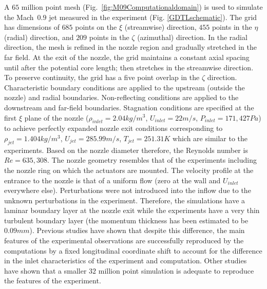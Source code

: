 \documentclass[english]{aiaa-tc}
\begin{document}
 A $65$ million point mesh (Fig.~\ref{fig:M09Computationaldomain}) is
 used to simulate the Mach~$0.9$ jet measured in the experiment (Fig.
 \ref{GDTLschematic}).  The grid has dimensions of $685$ points on the
 $\xi$ (streamwise) direction, $455$ points in the $\eta$ (radial)
 direction, and $209$ points in the $\zeta$ (azimuthal) direction. In
 the radial direction, the mesh is refined in the nozzle region and
 gradually stretched in the far field. At the exit of the nozzle, the
 grid maintains a constant axial spacing until after the potential
 core length; then stretches in the streamwise direction. To
 preserve continuity, the grid has a five point overlap in the $\zeta$
 direction. Characteristic boundary conditions\cite{bj2000-1} are
 applied to the upstream (outside the nozzle) and radial boundaries.
 Non-reflecting conditions are applied to the downstream and far-field
 boundaries. Stagnation conditions are specified at the first $\xi$
 plane of the nozzle ($\rho_{inlet}=2.04kg/m^{3}$, $U_{inlet}=22m/s$, $P_{inlet}=171,427Pa$) to
 achieve perfectly expanded nozzle exit conditions corresponding to
 $\rho_{jet}=1.404kg/m^{3}$, $U_{jet}=285.99m/s$, $T_{jet}=251.31K$ which are similar to the experiments.
 Based on the nozzle diameter therefore, the Reynolds number is
 $Re=635,308$. The nozzle geometry resembles that of the
 experiments including the nozzle ring on which the actuators are
 mounted.
 The velocity profile at the entrance to the nozzle is that
 of a uniform flow (zero at the wall and $U_{inlet}$ everywhere else).
 Perturbations were not introduced into the inflow due to the
 unknown perturbations in the experiment. Therefore, the simulations
 have a laminar boundary layer at the nozzle exit while the
 experiments have a very thin turbulent boundary layer (the momentum
 thickness has been estimated to be $0.09 mm$).  Previous studies have
 shown that despite this difference, the main features of the
 experimental observations are successfully reproduced by the
 computations by a fixed longitudinal coordinate shift to account
 for the difference in the inlet characteristics of the experiment and computation\cite{gdv2011-POF,SpethCF2013}.  Other studies have shown
 that a smaller $32$ million point simulation is adequate to reproduce
 the features of the experiment\cite{spethASME2013}.
\end{document}
